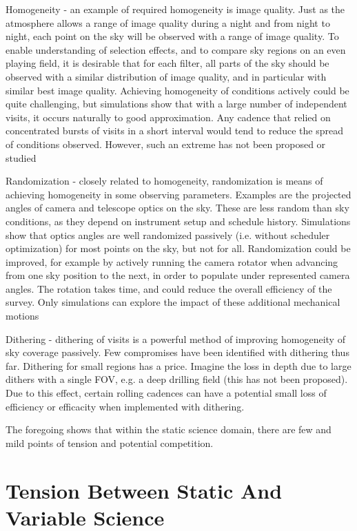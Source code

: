Homogeneity - an  example of required homogeneity is image quality.  Just as the atmosphere allows a range of image quality during a night and from night to night, each point on the sky will be observed with a range of image quality.  To enable understanding of selection effects, and to compare sky regions on an even playing field, it is desirable that for each filter, all parts of the sky should be observed with a similar distribution of image quality, and in particular with similar best image quality. Achieving homogeneity of conditions actively could be quite challenging, but simulations show that with a large number of independent visits, it occurs naturally to good approximation.  Any cadence that relied on concentrated bursts of visits in a short interval  would tend to reduce the spread of conditions observed. However, such an extreme has not been proposed or studied
	
Randomization - closely related to homogeneity, randomization is means of achieving homogeneity in some observing parameters.  Examples are the projected angles of camera and telescope optics on the sky. These are less random than sky conditions, as they depend on instrument setup and schedule history.  Simulations show that optics angles are well randomized passively (i.e. without scheduler optimization) for most points on the sky, but not for all.  Randomization could be improved, for example by actively running the camera rotator when advancing from one sky position to the next, in order to populate under represented camera angles. The rotation takes time, and could reduce the overall efficiency of the survey.  Only simulations can explore the impact of these additional mechanical motions

Dithering - dithering of visits is a powerful method of improving homogeneity of sky coverage passively. Few compromises have been identified with dithering thus far.  Dithering for small regions has a price. Imagine the loss in depth due to large dithers with a single FOV, e.g. a deep drilling field (this has not been proposed).  Due to this effect, certain rolling cadences can have a potential small loss of efficiency or efficacity when implemented with dithering. 

The foregoing shows that within the static science domain, there are few and mild points of tension and potential competition.  

\section{Tension Between Static And Variable Science}

